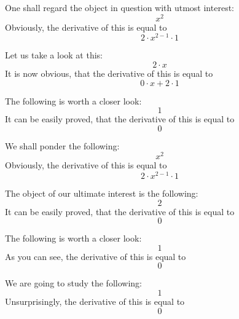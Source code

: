\documentclass{article}
\begin{document}
One shall regard the object in question with utmost interest:
\begin{equation}
x ^{2 } 
\end{equation}
Obviously, the derivative of this is equal to
\begin{equation}
2 \cdot x ^{2 - 1 } \cdot 1 
\end{equation}

Let us take a look at this:
\begin{equation}
2 \cdot x 
\end{equation}
It is now obvious, that the derivative of this is equal to
\begin{equation}
0 \cdot x + 2 \cdot 1 
\end{equation}

The following is worth a closer look:
\begin{equation}
1 
\end{equation}
It can be easily proved, that the derivative of this is equal to
\begin{equation}
0 
\end{equation}

We shall ponder the following:
\begin{equation}
x ^{2 } 
\end{equation}
Obviously, the derivative of this is equal to
\begin{equation}
2 \cdot x ^{2 - 1 } \cdot 1 
\end{equation}

The object of our ultimate interest is the following:
\begin{equation}
2 
\end{equation}
It can be easily proved, that the derivative of this is equal to
\begin{equation}
0 
\end{equation}

The following is worth a closer look:
\begin{equation}
1 
\end{equation}
As you can see, the derivative of this is equal to
\begin{equation}
0 
\end{equation}

We are going to study the following:
\begin{equation}
1 
\end{equation}
Unsurprisingly, the derivative of this is equal to
\begin{equation}
0 
\end{equation}
\end{document}
